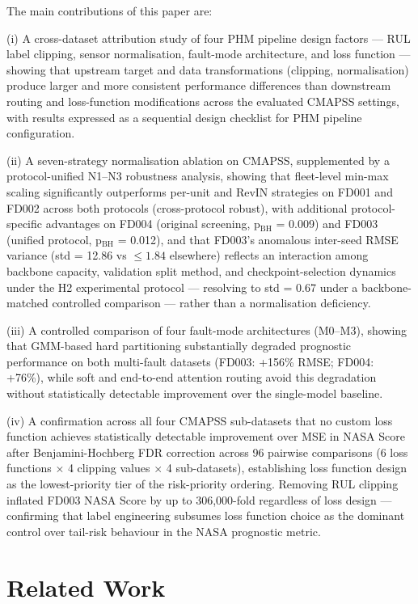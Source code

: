 \documentclass[review,12pt]{elsarticle}
\begin{document}
The main contributions of this paper are:

(i) A cross-dataset attribution study of four PHM pipeline design factors --- RUL label clipping, sensor normalisation, fault-mode architecture, and loss function --- showing that upstream target and data transformations (clipping, normalisation) produce larger and more consistent performance differences than downstream routing and loss-function modifications across the evaluated CMAPSS settings, with results expressed as a sequential design checklist for PHM pipeline configuration.

(ii) A seven-strategy normalisation ablation on CMAPSS, supplemented by a protocol-unified N1--N3 robustness analysis, showing that fleet-level min-max scaling significantly outperforms per-unit and RevIN strategies on FD001 and FD002 across both protocols (cross-protocol robust), with additional protocol-specific advantages on FD004 (original screening, p$_\text{BH}$ = 0.009) and FD003 (unified protocol, p$_\text{BH}$ = 0.012), and that FD003's anomalous inter-seed RMSE variance (std = 12.86 vs $\leq\!1.84$ elsewhere) reflects an interaction among backbone capacity, validation split method, and checkpoint-selection dynamics under the H2 experimental protocol --- resolving to std = 0.67 under a backbone-matched controlled comparison --- rather than a normalisation deficiency.

(iii) A controlled comparison of four fault-mode architectures (M0--M3), showing that GMM-based hard partitioning substantially degraded prognostic performance on both multi-fault datasets (FD003: +156\% RMSE; FD004: +76\%), while soft and end-to-end attention routing avoid this degradation without statistically detectable improvement over the single-model baseline.

(iv) A confirmation across all four CMAPSS sub-datasets that no custom loss function achieves statistically detectable improvement over MSE in NASA Score after Benjamini-Hochberg FDR correction across 96 pairwise comparisons (6 loss functions $\times$ 4 clipping values $\times$ 4 sub-datasets), establishing loss function design as the lowest-priority tier of the risk-priority ordering. Removing RUL clipping inflated FD003 NASA Score by up to 306,000-fold regardless of loss design --- confirming that label engineering subsumes loss function choice as the dominant control over tail-risk behaviour in the NASA prognostic metric.

\section{Related Work}
\end{document}
